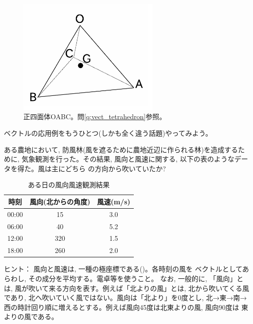 \begin{figure}
    \centering
    \includegraphics[width=7cm]{tetrahedron2.eps}
    \caption{正四面体OABC。問\ref{q:vect_tetrahedron}参照。\label{fig:tetrahedron}}
\end{figure}
\hv

ベクトルの応用例をもうひとつ(しかも全く違う話題)やってみよう。

\begin{q}\label{q:vect_wind2D} ある農地において, 防風林(風を遮るために農地近辺に作られる林)を造成するために, 
気象観測を行った。その結果, 風向と風速に関する, 以下の表のようなデータを得た。風は主にどちら
の方向から吹いていたか?
\begin{table}[!htb]\caption{ある日の風向風速観測結果}
\begin{center}
\begin{tabular}{ccc}\hline
時刻 & 風向(北からの角度) & 風速(m/s) \\  \hline
00:00 & 15& 3.0\\
06:00 & 40& 5.2\\
12:00 & 320& 1.5\\
18:00 & 260& 2.0\\  \hline
\end{tabular}
\end{center}
\end{table}
\small{ヒント： 風向と風速は, 一種の極座標である()。各時刻の風を
ベクトルとしてあらわし, その成分を平均する。電卓等を使うこと。
なお, 一般的に, 「風向」とは, 風が吹いて来る方向を表す。例えば「北よりの風」とは,
 北から吹いてくる風であり, 北へ吹いていく風ではない。風向は「北より」を0度とし, 
北→東→南→西の時計回り順に増えるとする。例えば風向45度は北東よりの風, 風向90度は
東よりの風である。}
\end{q}


